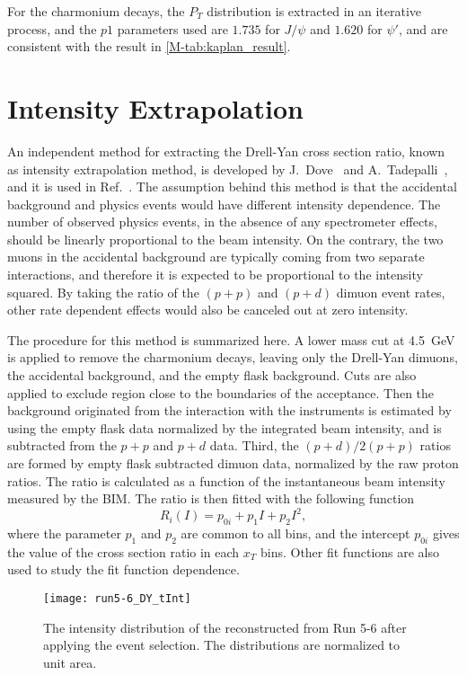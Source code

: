 \documentclass[../main.tex]{subfiles}
\begin{document}
For the charmonium decays, the $P_T$ distribution is extracted in an iterative process, and the $p1$
parameters used are $1.735$ for $J/\psi$ and $1.620$ for $\psi'$, and are consistent with the result in
\cref{M-tab:kaplan_result}.

\section{Intensity Extrapolation}
\label{sec:extrapolation}
An independent method for extracting the Drell-Yan cross section ratio, known as intensity extrapolation method,
is developed by J.~Dove~\cite{dove2020} and A.~Tadepalli~\cite{tadepalli2019},
and it is used in Ref.~\cite{dove2021}.
The assumption behind this method is that the accidental background and physics events
would have different intensity dependence. The number of observed physics
events, in the absence of any spectrometer effects, should be linearly proportional to the beam
intensity. On the contrary, the two muons in the accidental background are typically coming from
two separate interactions, and therefore it is expected to be proportional to the intensity squared.
By taking the ratio of the $(p+p)$ and $(p+d)$ dimuon event rates,
other rate dependent effects would also be canceled out at zero intensity.

The procedure for this method is summarized here. A lower mass cut at \SI{4.5}{\GeV} is applied to
remove the charmonium decays, leaving only the Drell-Yan dimuons, the accidental background,
and the empty flask background.
Cuts are also applied to exclude region close to the boundaries of the acceptance.
Then the background originated from the interaction with the instruments is estimated by using
the empty flask data normalized by the integrated beam intensity, and is subtracted from the
$p+p$ and $p+d$ data. Third, the $(p+d)/2(p+p)$ ratios are formed by empty flask subtracted
dimuon data, normalized by the raw proton ratios. The ratio is calculated as a function of the
instantaneous beam intensity measured by the BIM. The ratio is then fitted with the following function
\begin{equation}
	R_i \left(I\right) = p_{0i} + p_1 I + p_2 I^2,
	\label{eq:common_pol2}
\end{equation}
where the parameter $p_1$ and $p_2$ are common to all bins, and the intercept $p_{0i}$ gives
the value of the cross section ratio in each $x_T$ bins. Other fit functions are also used
to study the fit function dependence.

\begin{figure}
	\centering
	\texttt{[image: run5-6\_DY\_tInt]}
	\caption{The intensity distribution of the reconstructed from Run 5-6 after applying the event selection.
		The distributions are normalized to unit area.}
	\label{fig:tInt_distribution}
\end{figure}
\end{document}
